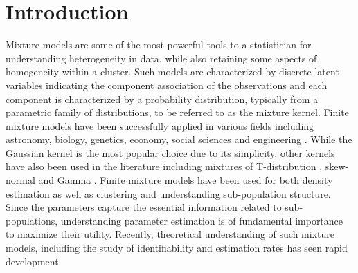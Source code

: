 \documentclass[bj,authoryear]{imsart}
\theoremstyle{plain}
\theoremstyle{remark}
\begin{document}
\begin{frontmatter}
\begin{keyword}
\end{keyword}

\end{frontmatter}

\section{Introduction}\label{sec:introduction}
Mixture models are some of the most powerful tools to a statistician for understanding heterogeneity in data, while also retaining some aspects of homogeneity within a cluster. Such models are characterized by discrete latent variables indicating the component association of the observations and each component is characterized by a probability distribution, typically from a parametric family of distributions, to be referred to as the mixture kernel. Finite mixture models have been successfully applied in various fields including astronomy, biology, genetics, economy, social sciences and engineering \cite{mclachlan2000finite}. While the Gaussian kernel is the most popular choice due to its simplicity, other kernels have also been used in the literature including mixtures of T-distribution \cite{burgess2020finite}, skew-normal \cite{lin2007finite} and Gamma \cite{wiper2001mixtures}.  Finite mixture models have been used for both density estimation as well as clustering and understanding sub-population structure. Since the parameters capture the essential information related to sub-populations, understanding parameter estimation is of fundamental importance to maximize their utility. Recently, theoretical understanding of such mixture models, including the study of identifiability and estimation rates has seen rapid development. 
\end{document}
